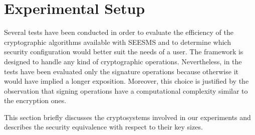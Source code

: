\documentclass[authoryear]{elsarticle}
\begin{document}
%
%
%
%


\section{Experimental Setup}
\label{sec:exp}
Several tests have been conducted in order to evaluate the efficiency of the cryptographic algorithms available with SEESMS and to determine which security configuration would better suit the needs of a user. The framework is designed to handle any kind of cryptographic operations. Nevertheless, in the tests have been evaluated only the signature operations because otherwise it would have implied a longer exposition. Moreover, this choice is justified by the observation that signing operations have a computational complexity similar to the encryption ones.

This section briefly discusses the cryptosystems involved in our experiments and describes the security equivalence with respect to their key sizes.
\end{document}
